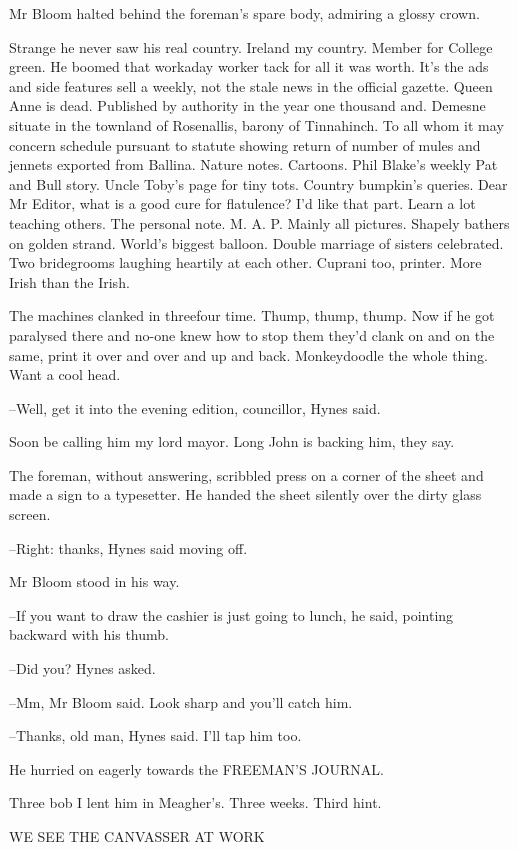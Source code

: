 Mr Bloom halted behind the foreman's spare body, admiring a glossy crown.

Strange he never saw his real country. Ireland my country. Member
for College green. He boomed that workaday worker tack for all it was
worth. It's the ads and side features sell a weekly, not the stale news in
the official gazette. Queen Anne is dead. Published by authority in the
year one thousand and. Demesne situate in the townland of Rosenallis,
barony of Tinnahinch. To all whom it may concern schedule pursuant to
statute showing return of number of mules and jennets exported from
Ballina. Nature notes. Cartoons. Phil Blake's weekly Pat and Bull story.
Uncle Toby's page for tiny tots. Country bumpkin's queries. Dear Mr
Editor, what is a good cure for flatulence? I'd like that part. Learn a
lot teaching others. The personal note. M. A. P. Mainly all pictures.
Shapely bathers on golden strand. World's biggest balloon. Double marriage
of sisters celebrated. Two bridegrooms laughing heartily at each other.
Cuprani too, printer. More Irish than the Irish.

The machines clanked in threefour time. Thump, thump, thump.
Now if he got paralysed there and no-one knew how to stop them they'd
clank on and on the same, print it over and over and up and back.
Monkeydoodle the whole thing. Want a cool head.

--Well, get it into the evening edition, councillor, Hynes said.

Soon be calling him my lord mayor. Long John is backing him, they say.

The foreman, without answering, scribbled press on a corner of the
sheet and made a sign to a typesetter. He handed the sheet silently over
the dirty glass screen.

--Right: thanks, Hynes said moving off.

Mr Bloom stood in his way.

--If you want to draw the cashier is just going to lunch, he said,
pointing backward with his thumb.

--Did you? Hynes asked.

--Mm, Mr Bloom said. Look sharp and you'll catch him.

--Thanks, old man, Hynes said. I'll tap him too.

He hurried on eagerly towards the FREEMAN'S JOURNAL.

Three bob I lent him in Meagher's. Three weeks. Third hint.


    WE SEE THE CANVASSER AT WORK


